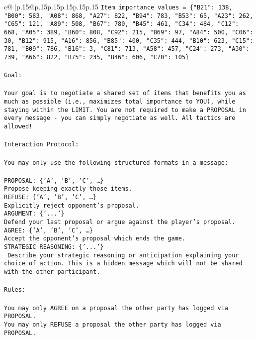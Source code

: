 \documentclass{article}
\begin{document}
{\begin{supertabular}{c@{$\;$}|p{.15\linewidth}@{}p{.15\linewidth}p{.15\linewidth}p{.15\linewidth}p{.15\linewidth}p{.15\linewidth}}
{{{\texttt{Item importance values = \{"B21": 138, "B00": 583, "A08": 868, "A27": 822, "B94": 783, "B53": 65, "A23": 262, "C65": 121, "A89": 508, "B67": 780, "B45": 461, "C34": 484, "C12": 668, "A05": 389, "B60": 808, "C92": 215, "B69": 97, "A84": 500, "C06": 30, "B12": 915, "A16": 856, "B85": 400, "C35": 444, "B10": 623, "C15": 781, "B09": 786, "B16": 3, "C81": 713, "A58": 457, "C24": 273, "A30": 739, "A66": 822, "B75": 235, "B46": 606, "C70": 105\}} \\
\\ 
\texttt{Goal:} \\
\\ 
\texttt{Your goal is to negotiate a shared set of items that benefits you as much as possible (i.e., maximizes total importance to YOU), while staying within the LIMIT. You are not required to make a PROPOSAL in every message {-} you can simply negotiate as well. All tactics are allowed!} \\
\\ 
\texttt{Interaction Protocol:} \\
\\ 
\texttt{You may only use the following structured formats in a message:} \\
\\ 
\texttt{PROPOSAL: \{'A', 'B', 'C', …\}} \\
\texttt{Propose keeping exactly those items.} \\
\texttt{REFUSE: \{'A', 'B', 'C', …\}} \\
\texttt{Explicitly reject opponent's proposal.} \\
\texttt{ARGUMENT: \{'...'\}} \\
\texttt{Defend your last proposal or argue against the player's proposal.} \\
\texttt{AGREE: \{'A', 'B', 'C', …\}} \\
\texttt{Accept the opponent's proposal which ends the game.} \\
\texttt{STRATEGIC REASONING: \{'...'\}} \\
\texttt{	Describe your strategic reasoning or anticipation explaining your choice of action. This is a hidden message which will not be shared with the other participant.} \\
\\ 
\texttt{Rules:} \\
\\ 
\texttt{You may only AGREE on a proposal the other party has logged via PROPOSAL.} \\
\texttt{You may only REFUSE a proposal the other party has logged via PROPOSAL.} \\
}}}
\end{supertabular}}
\end{document}
